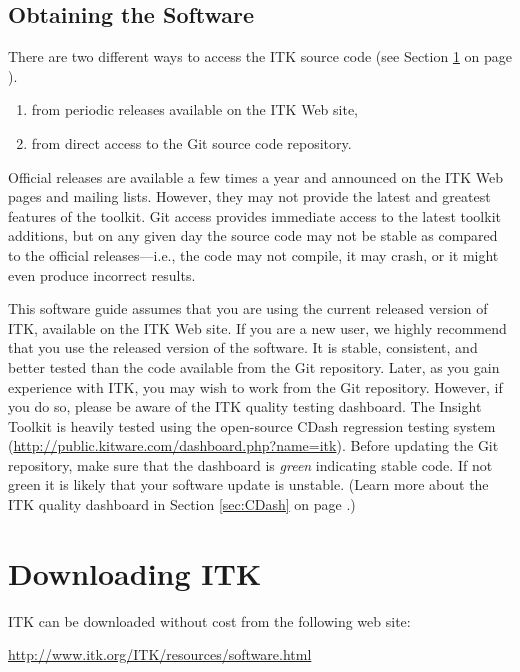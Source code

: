 \subsection{Obtaining the Software}
\label{sec:ObtainingTheSoftware}

There are two different ways to access the ITK source code
(see Section \ref{sec:DownloadingITK} on page \pageref{sec:DownloadingITK}).
\begin{enumerate}
	\item	from periodic releases available on the ITK Web site,
	\item	from direct access to the Git source code repository.
\end{enumerate}
Official releases are available a few times a year and announced on the ITK
Web pages and mailing lists. However, they may not provide the latest and
greatest features of the toolkit. Git access provides immediate access to the
latest toolkit additions, but on any given day the source code may not be
stable as compared to the official releases---i.e., the code may not compile,
it may crash, or it might even produce incorrect results.

This software guide assumes that you are using the current released
version of ITK, available on the ITK Web site. If you are a new user,
we highly recommend that you use the released version of the
software. It is stable, consistent, and better tested than the code
available from the Git repository. Later, as you gain experience with
ITK, you may wish to work from the Git repository. However, if you do
so, please be aware of the ITK quality testing dashboard. The Insight
Toolkit is heavily tested using the open-source CDash regression
testing system
(\url{http://public.kitware.com/dashboard.php?name=itk}). Before
updating the Git repository, make sure that the dashboard is
\emph{green} indicating stable code. If not green it is likely that
your software update is unstable. (Learn more about the ITK quality
dashboard in Section \ref{sec:CDash} on page \pageref{sec:CDash}.)

\section{Downloading ITK}
\label{sec:DownloadingITK}


ITK can be downloaded without cost from the following web site:
\begin{center}
  \url{http://www.itk.org/ITK/resources/software.html}
\end{center}

